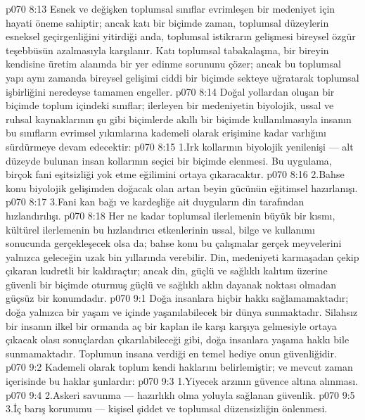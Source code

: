 \vs p070 8:13 Esnek ve değişken toplumsal sınıflar evrimleşen bir medeniyet için hayati öneme sahiptir; ancak  katı bir biçimde  zaman, toplumsal düzeylerin esneksel geçirgenliğini yitirdiği anda, toplumsal istikrarın gelişmesi bireysel özgür teşebbüsün azalmasıyla karşılanır. Katı toplumsal tabakalaşma, bir bireyin kendisine üretim alanında bir yer edinme sorununu çözer; ancak bu toplumsal yapı aynı zamanda bireysel gelişimi ciddi bir biçimde sekteye uğratarak toplumsal işbirliğini neredeyse tamamen engeller.
\vs p070 8:14 Doğal yollardan oluşan bir biçimde toplum içindeki sınıflar; ilerleyen bir medeniyetin biyolojik, ussal ve ruhsal kaynaklarının şu gibi biçimlerde akıllı bir biçimde kullanılmasıyla insanın bu sınıfların evrimsel yıkımlarına kademeli olarak erişimine kadar varlığını sürdürmeye devam edecektir:
\vs p070 8:15 1.\bibnobreakspace Irk kollarının biyolojik yenilenişi --- alt düzeyde bulunan insan kollarının seçici bir biçimde elenmesi. Bu uygulama, birçok fani eşitsizliği yok etme eğilimini ortaya çıkaracaktır.
\vs p070 8:16 2.\bibnobreakspace Bahse konu biyolojik gelişimden doğacak olan artan beyin gücünün eğitimsel hazırlanışı.
\vs p070 8:17 3.\bibnobreakspace Fani kan bağı ve kardeşliğe ait duyguların din tarafından hızlandırılışı.
\vs p070 8:18 Her ne kadar toplumsal ilerlemenin büyük bir kısmı, kültürel ilerlemenin bu hızlandırıcı etkenlerinin ussal, bilge ve  kullanımı sonucunda gerçekleşecek olsa da; bahse konu bu çalışmalar gerçek meyvelerini yalnızca geleceğin uzak bin yıllarında verebilir. Din, medeniyeti karmaşadan çekip çıkaran kudretli bir kaldıraçtır; ancak din, güçlü ve sağlıklı kalıtım üzerine güvenli bir biçimde oturmuş güçlü ve sağlıklı aklın dayanak noktası olmadan güçsüz bir konumdadır.
\vs p070 9:1 Doğa insanlara hiçbir hakkı sağlamamaktadır; doğa yalnızca bir yaşam ve içinde yaşanılabilecek bir dünya sunmaktadır. Silahsız bir insanın ilkel bir ormanda aç bir kaplan ile karşı karşıya gelmesiyle ortaya çıkacak olası sonuçlardan çıkarılabileceği gibi, doğa insanlara yaşama hakkı bile sunmamaktadır. Toplumun insana verdiği en temel hediye onun güvenliğidir.
\vs p070 9:2 Kademeli olarak toplum kendi haklarını belirlemiştir; ve mevcut zaman içerisinde bu haklar şunlardır:
\vs p070 9:3 1.\bibnobreakspace Yiyecek arzının güvence altına alınması.
\vs p070 9:4 2.\bibnobreakspace Askeri savunma --- hazırlıklı olma yoluyla sağlanan güvenlik.
\vs p070 9:5 3.\bibnobreakspace İç barış korunumu --- kişisel şiddet ve toplumsal düzensizliğin önlenmesi.
